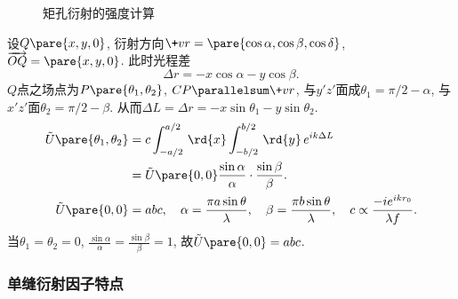 \documentclass{ctexart}
\begin{document}
\begin{figure}[ht]
    \centering
    \caption{矩孔衍射的强度计算}
\end{figure}
设$Q\pare{x,y,0}$, 衍射方向$\+vr = \pare{\cos\alpha,\cos\beta,\cos\delta}$, $\overrightarrow{OQ} = \pare{x,y,0}$. 此时光程差
\[ \Delta r = -x\cos\alpha - y\cos\beta. \]
$Q$点之场点为$P\pare{\theta_1,\theta_2}$, $CP\parallelsum \+vr$, 与$y'z'$面成$\theta_1 = \pi/2-\alpha$, 与$x'z'$面$\theta_2 = \pi/2 - \beta$. 从而$\Delta L = \Delta r = -x\sin\theta_1 - y\sin\theta_2$.
\begin{align*}
    \tilde{U}\pare{\theta_1,\theta_2} &= c\int_{-a/2}^{a/2} \,\rd{x} \int_{-b/2}^{b/2}\,\rd{y}\, e^{ik\Delta L} \\
    &= \tilde{U}\pare{0,0} \frac{\sin \alpha}{\alpha}\cdot \frac{\sin\beta}{\beta}. \\
    \tilde{U}\pare{0,0} &= abc,\quad \alpha = \frac{\pi a\sin\theta}{\lambda},\quad \beta = \frac{\pi b\sin\theta}{\lambda},\quad c \propto \frac{-ie^{ikr_0}}{\lambda f}.
\end{align*}
当$\theta_1 = \theta_2 = 0$, $\displaystyle \frac{\sin\alpha}{\alpha} = \frac{\sin\beta}{\beta} = 1$, 故$\tilde{U}\pare{0,0} = abc$.


\subsubsection{单缝衍射因子特点} %
\label{ssub:单缝衍射因子特点}
\end{document}
